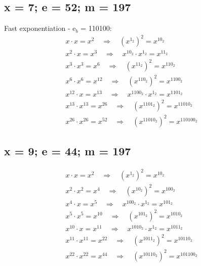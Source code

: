 \subsection{x = 7; e = 52; m = 197}
\label{sec:1c}
Fast exponentiation - e$_{b}$ = 110100: \\
\begin{equation}
\begin{split}
x \cdot x = x^{2} \quad\Rightarrow\quad (x^{1_{2}})^2 = x^{10_{2}} \\
x^{2} \cdot x = x^{3} \quad\Rightarrow\quad x^{10_{2}} \cdot x^{1_{2}} = x^{11_{2}} \\
x^{3} \cdot x^{3} = x^{6} \quad\Rightarrow\quad (x^{11_{2}})^2 = x^{110_{2}} \\
x^{6} \cdot x^{6} = x^{12} \quad\Rightarrow\quad (x^{110_{2}})^2 = x^{1100_{2}} \\
x^{12} \cdot x = x^{13} \quad\Rightarrow\quad x^{1100_{2}} \cdot x^{1_{2}} = x^{1101_{2}} \\
x^{13} \cdot x^{13} = x^{26} \quad\Rightarrow\quad (x^{1101_{2}})^2 = x^{11010_{2}} \\
x^{26} \cdot x^{26} = x^{52} \quad\Rightarrow\quad (x^{11010_{2}})^2 = x^{110100_{2}} 
\end{split}
\end{equation}

\subsection{x = 9; e = 44; m = 197}
\label{sec:1d}
\begin{equation}
\begin{split}
x \cdot x = x^{2} \quad\Rightarrow\quad (x^{1_{2}})^2 = x^{10_{2}} \\
x^{2} \cdot x^{2} = x^{4} \quad\Rightarrow\quad (x^{10_{2}})^2 = x^{100_{2}} \\
x^{4} \cdot x = x^{5} \quad\Rightarrow\quad x^{100_{2}} \cdot x^{1_{2}} = x^{101_{2}} \\
x^{5} \cdot x^{5} = x^{10} \quad\Rightarrow\quad (x^{101_{2}})^2 = x^{1010_{2}} \\
x^{10} \cdot x = x^{11} \quad\Rightarrow\quad x^{1010_{2}} \cdot x^{1_{2}} = x^{1011_{2}} \\
x^{11} \cdot x^{11} = x^{22} \quad\Rightarrow\quad (x^{1011_{2}})^2 = x^{10110_{2}} \\
x^{22} \cdot x^{22} = x^{44} \quad\Rightarrow\quad (x^{10110_{2}})^2 = x^{101100_{2}} \\
\end{split}
\end{equation}

